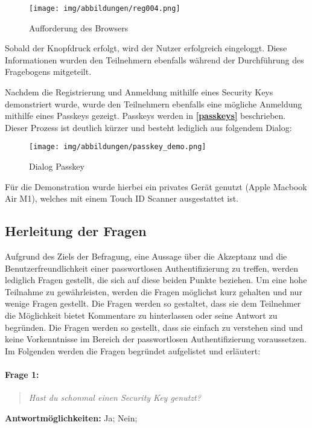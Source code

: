 \begin{figure}[h]
	\centering 
	\texttt{[image: img/abbildungen/reg004.png]}
	\captionsetup{format=hang}
	\caption{Aufforderung des Browsers}
\end{figure}

Sobald der Knopfdruck erfolgt, wird der Nutzer erfolgreich eingeloggt. Diese Informationen wurden den Teilnehmern ebenfalls während der Durchführung des Fragebogens mitgeteilt. 

Nachdem die Registrierung und Anmeldung mithilfe eines Security Keys demonstriert wurde, wurde den Teilnehmern ebenfalls eine mögliche Anmeldung mithilfe eines Passkeys gezeigt. Passkeys werden in \textbf{\ref{passkeys}} beschrieben. Dieser Prozess ist deutlich kürzer und besteht lediglich aus folgendem Dialog:

\begin{figure}[H]
	\centering 
	\texttt{[image: img/abbildungen/passkey\_demo.png]}
	\captionsetup{format=hang}
	\caption{Dialog Passkey}
\end{figure}

Für die Demonstration wurde hierbei ein privates Gerät genutzt (Apple Macbook Air M1), welches mit einem Touch ID Scanner ausgestattet ist.


\subsection{Herleitung der Fragen} \label{questions}
Aufgrund des Ziels der Befragung, eine Aussage über die Akzeptanz und die Benutzerfreundlichkeit einer passwortlosen Authentifizierung zu treffen, werden lediglich Fragen gestellt, die sich auf diese beiden Punkte beziehen. Um eine hohe Teilnahme zu gewährleisten, werden die Fragen möglichst kurz gehalten und nur wenige Fragen gestellt. Die Fragen werden so gestaltet, dass sie dem Teilnehmer die Möglichkeit bietet Kommentare zu hinterlassen oder seine Antwort zu begründen. Die Fragen werden so gestellt, dass sie einfach zu verstehen sind und keine Vorkenntnisse im Bereich der passwortlosen Authentifizierung voraussetzen. Im Folgenden werden die Fragen begründet aufgelistet und erläutert:

\paragraph{Frage 1:}

\begin{quote}
    \textit{Hast du schonmal einen Security Key genutzt?}
\end{quote}
\textbf{Antwortmöglichkeiten:} Ja; Nein; 

